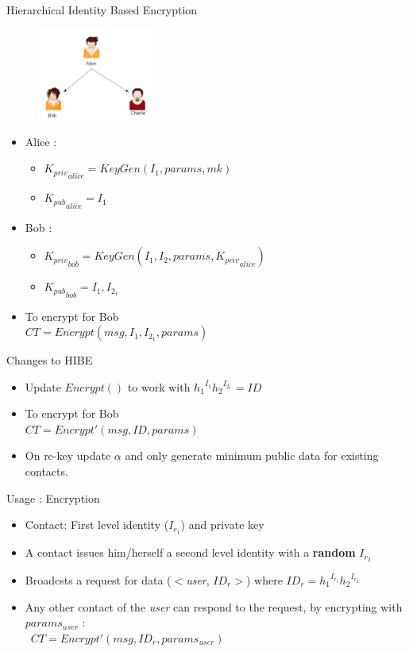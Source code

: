 \documentclass{beamer}
\begin{document}
\begin{frame}{Hierarchical Identity Based Encryption}
\begin{figure}
\includegraphics[height=3cm]{img/img3.png} 
\end{figure}

\begin{itemize}
\item Alice :
\begin{itemize}
\item ${K_{priv}}_{alice} = KeyGen(I_1, params, mk)$ 
\item ${K_{pub}}_{alice} = I_1$
\end{itemize}

\item Bob :
\begin{itemize}
\item ${K_{priv}}_{bob} = KeyGen(I_1, I_2, params, {K_{priv}}_{alice})$
\item ${K_{pub}}_{bob} = I_1, I_{2_1}$
\end{itemize}

\item To encrypt for Bob \\ $CT = Encrypt(msg, I_1, I_{2_1}, params)$


\end{itemize}
\end{frame}

\begin{frame}{Changes to HIBE}

\begin{itemize}
\item Update $Encrypt()$ to work with ${h_1}^{I_1}{h_2}^{I_{2_1}} = ID$
\item To encrypt for Bob \\ $CT = Encrypt'(msg, ID, params)$
\item On re-key update $\alpha$ and only generate minimum public data for existing contacts.
\end{itemize}
\end{frame}

\begin{frame}{Usage : Encryption}
\begin{itemize}
\item Contact: First level identity ($I_{r_1}$) and private key
\item A contact issues him/herself a second level identity with a \textbf{random} $I_{r_2}$
\item Broadcsts a request for data ($<$\emph{user}, $ID_r>$) where $ID_r = {h_1}^{I_{r_1}}{h_2}^{I_{r_2}}$
\item Any other contact of the \emph{user} can respond to the request, by encrypting with $params_{user}$ : \\\
$CT = Encrypt'(msg, ID_r, params_{user})$
\end{itemize}
\end{frame}
\end{document}
